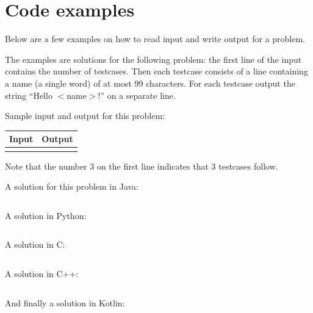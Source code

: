 \newpage
\appendix

\section{Code examples}\label{codeexamples}

Below are a few examples on how to read input and write output for a
problem.

The examples are solutions for the following problem: the first line
of the input contains the number of testcases. Then each testcase
consists of a line containing a name (a single word) of at most 99
characters. For each testcase output the string ``Hello $<$name$>$!''
on a separate line.

Sample input and output for this problem:

\begin{tabular}{|p{}|p{}|}
\hline
\textbf{Input} & \textbf{Output} \\
\hline
 &
 \\
\hline
\end{tabular}

Note that the number 3 on the first line indicates that 3 testcases
follow.

A solution for this problem in Java:
\inputminted{java}{../examples/example.java}

A solution in Python:
\inputminted{python}{../examples/example.py}

\newpage

A solution in C:
\inputminted{c}{../examples/example.c}

A solution in C++:
\inputminted{cpp}{../examples/example.cc}

And finally a solution in Kotlin:
\inputminted{kotlin}{../examples/example.kt}


